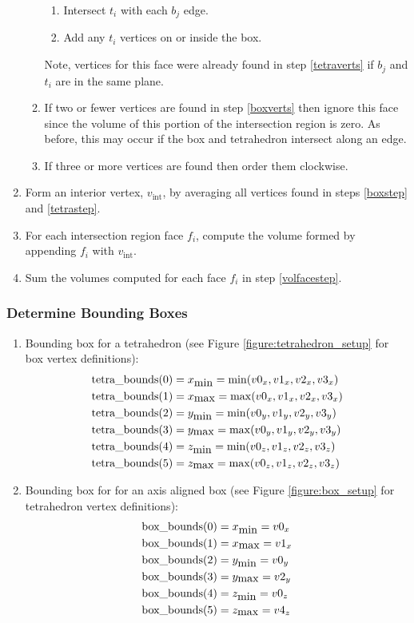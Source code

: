 \documentclass[12pt]{article}
\begin{document}
\begin{enumerate}
\begin{enumerate}
\begin{enumerate}
\item Intersect $t_i$ with each $b_j$ edge.
\item Add any $t_i$ vertices on or inside the box.
\end{enumerate}
Note, vertices for this face were already found in step \ref{tetraverts} if $b_j$ and $t_i$ are in the same plane.
\item If two or fewer vertices are found in step \ref{boxverts} then ignore this face since the volume of this portion of the intersection region is zero. As before, this may occur if the box and tetrahedron  intersect along an edge.
\item If three or more vertices are found then order them clockwise.
\end{enumerate}

\item Form an interior vertex, $v_\mathrm{int}$, by averaging all vertices found in steps \ref{boxstep} and \ref{tetrastep}.

\item For each intersection region face $f_i$, compute the volume formed by appending $f_i$ with $v_\mathrm{int}$.
\label{volfacestep}

\item Sum the volumes computed for each face $f_i$ in step \ref{volfacestep}.
\end{enumerate}

\subsubsection{Determine Bounding Boxes}
\begin{enumerate}
\item Bounding box for a tetrahedron (see Figure \ref{figure:tetrahedron_setup} for box vertex definitions):
\begin{eqnarray*}
\mbox{tetra\_bounds}(0)&=x_{\mbox{min}}=\min(v0_x,v1_x,v2_x,v3_x)\\
\mbox{tetra\_bounds}(1)&=x_{\mbox{max}}=\max(v0_x,v1_x,v2_x,v3_x)\\
\mbox{tetra\_bounds}(2)&=y_{\mbox{min}}=\min(v0_y,v1_y,v2_y,v3_y)\\
\mbox{tetra\_bounds}(3)&=y_{\mbox{max}}=\max(v0_y,v1_y,v2_y,v3_y)\\
\mbox{tetra\_bounds}(4)&=z_{\mbox{min}}=\min(v0_z,v1_z,v2_z,v3_z)\\
\mbox{tetra\_bounds}(5)&=z_{\mbox{max}}=\max(v0_z,v1_z,v2_z,v3_z)
\end{eqnarray*}

\item Bounding box for for an axis aligned box (see Figure \ref{figure:box_setup} for tetrahedron vertex definitions):
\begin{eqnarray*}
\mbox{box\_bounds}(0)&=x_{\mbox{min}}=v0_x\\
\mbox{box\_bounds}(1)&=x_{\mbox{max}}=v1_x\\
\mbox{box\_bounds}(2)&=y_{\mbox{min}}=v0_y\\
\mbox{box\_bounds}(3)&=y_{\mbox{max}}=v2_y\\
\mbox{box\_bounds}(4)&=z_{\mbox{min}}=v0_z\\
\mbox{box\_bounds}(5)&=z_{\mbox{max}}=v4_z
\end{eqnarray*}
\end{enumerate}
\end{document}

